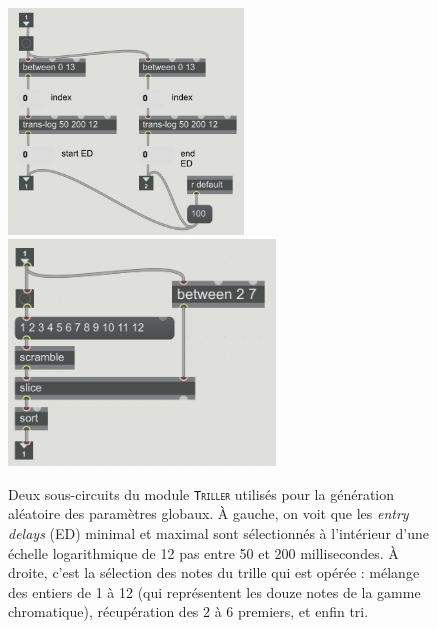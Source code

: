 \documentclass[a4paper,12pt]{article}
\newcommand{\module}[1]{\texttt{\textsc{#1}}}
\begin{document}
\begin{figure}[h!]
\begin{center}
\includegraphics[height=6cm]{images/trillerED.jpg}~~~\includegraphics[height=6cm]{images/trillernotes.jpg}
\label{trillerf}
\caption{\footnotesize Deux sous-circuits du module \module{Triller} utilisés pour la génération aléatoire des paramètres globaux. À gauche, on voit que les \emph{entry delays} (ED) minimal et maximal sont sélectionnés à l'intérieur d'une échelle logarithmique de 12 pas entre 50 et 200 millisecondes. À droite, c'est la sélection des notes du trille qui est opérée : mélange des entiers de 1 à 12 (qui représentent les douze notes de la gamme chromatique), récupération des 2 à 6 premiers, et enfin tri.}
\end{center}
\end{figure}
\end{document}
